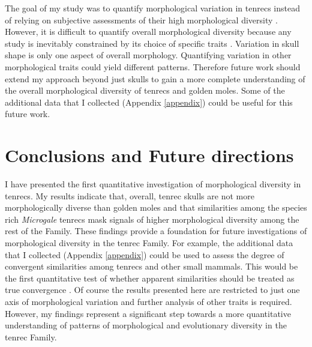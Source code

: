 	The goal of my study was to quantify morphological variation in tenrecs instead of relying on subjective assessments of their high morphological diversity \citep{Olson2013, Soarimalala2011, Eisenberg1969}. However, it is difficult to quantify overall morphological diversity because any study is inevitably constrained by its choice of specific traits \citep{Roy1997}. Variation in skull shape is only one aspect of overall morphology. Quantifying variation in other morphological traits could yield different patterns. Therefore future work should extend my approach beyond just skulls to gain a more complete understanding of the overall morphological diversity of tenrecs and golden moles. Some of the additional data that I collected (Appendix \ref{appendix}) could be useful for this future work.



\section{Conclusions and Future directions}
\label{sect:concl}

	I have presented the first quantitative investigation of morphological diversity in tenrecs. My results indicate that, overall, tenrec skulls are not more morphologically diverse than golden moles and that similarities among the species rich \textit{Microgale} tenrecs mask signals of higher morphological diversity among the rest of the Family. These findings provide a foundation for future investigations of morphological diversity in the tenrec Family. For example, the additional data that I collected (Appendix \ref{appendix}) could be used to assess the degree of convergent similarities among tenrecs and other small mammals. This would be the first quantitative test of whether apparent similarities \citep{Olson2013, Soarimalala2011, Eisenberg1969} should be treated as true convergence \citep[e.g.][]{Losos2011, Stayton2008}.
	Of course the results presented here are restricted to just one axis of morphological variation and further analysis of other traits is required. However, my findings represent a significant step towards a more quantitative understanding of patterns of morphological and evolutionary diversity in the tenrec Family. 






